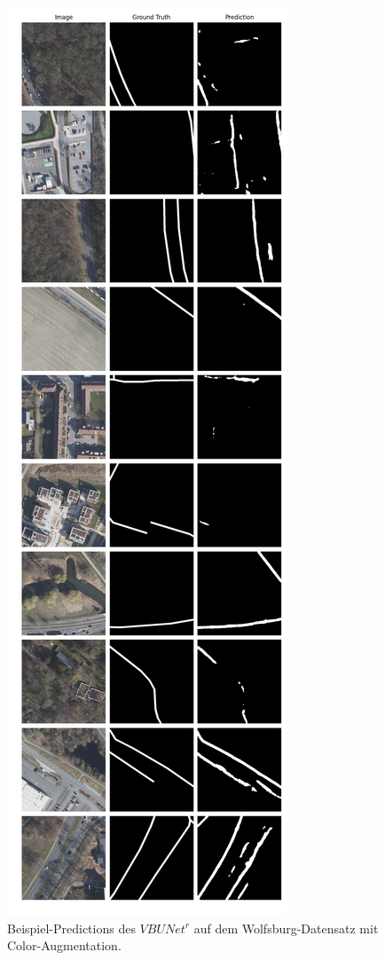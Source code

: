 \begin{figure}
	\centering
	\includegraphics[width=.41\textwidth]{Bilder/wolfsburg-color-samples/vbunet-r.png}
	\caption{Beispiel-Predictions des $VBUNet^r$ auf dem Wolfsburg-Datensatz mit Color-Augmentation.}
	\label{fig:wolfsburg-color-samples-vbunet-r}
\end{figure}

